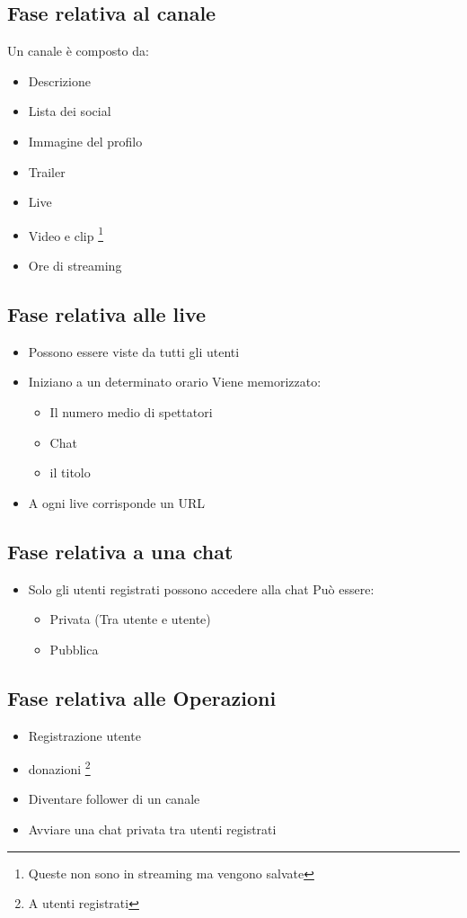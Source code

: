 \subsection{Fase relativa al canale}
Un canale è composto da:
\begin{itemize}
  \item Descrizione
  \item Lista dei social
  \item Immagine del profilo
  \item Trailer 
  \item Live 
  \item Video e clip \footnote{Queste non sono in streaming ma vengono salvate}
  \item Ore di streaming
\end{itemize}
\subsection{Fase relativa alle live}
\begin{itemize}
  \item Possono essere viste da tutti gli utenti
  \item Iniziano a un determinato orario
  Viene memorizzato:
    \begin{itemize}
      \item Il numero medio di spettatori
      \item Chat 
      \item il titolo
    \end{itemize}
    \item A ogni live corrisponde un URL
\end{itemize}
\subsection{Fase relativa a una chat}
\begin{itemize}
  \item Solo gli utenti registrati possono accedere alla chat
  Può essere:
  \begin{itemize}
    \item Privata (Tra utente e utente)
    \item Pubblica 
  \end{itemize}
\end{itemize}
\subsection{Fase relativa alle Operazioni}
\begin{itemize}
  \item Registrazione utente
  \item donazioni \footnote{A utenti registrati}
  \item Diventare follower di un canale
  \item Avviare una chat privata tra utenti registrati
\end{itemize}